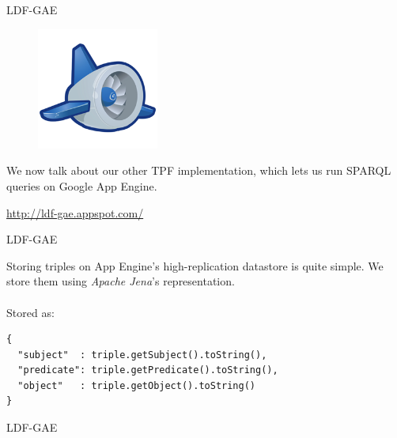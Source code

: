 \documentclass[20pt]{extarticle}
\begin{document}
{\newpage

\begin{center}
{\fontsize{35}{35}\color{blue} \sc LDF-GAE}
\end{center}
\vspace{10 mm}
\begin{figure}[ht!]
\centering
\includegraphics[width=40mm]{appengine-logo.png}
\end{figure}
{\fontsize{30}{30} {\cmr 
\noindent We now talk about our other TPF implementation, which lets us run SPARQL queries on {\color{blue}Google App Engine}.

\begin{center}
\url{http://ldf-gae.appspot.com/}
\end{center}
}} 


\newpage

\begin{center}
{\fontsize{35}{35}\color{blue} \sc LDF-GAE}
\end{center}
\vspace{20 mm}

{\fontsize{30}{30} {\cmr 
\noindent Storing triples on App Engine's high-replication datastore is quite simple. We store them using \textit{Apache Jena}'s representation.
\\ \\
{\color{blue}Stored as:}
}} 
\begin{center}
\begin{small}
\begin{verbatim}
{
  "subject"  : triple.getSubject().toString(),
  "predicate": triple.getPredicate().toString(),
  "object"   : triple.getObject().toString()
}
\end{verbatim}
\end{small}
\end{center}


\newpage

\begin{center}
{\fontsize{35}{35}\color{blue} \sc LDF-GAE}
\end{center}
\vspace{20 mm}

}
\end{document}
